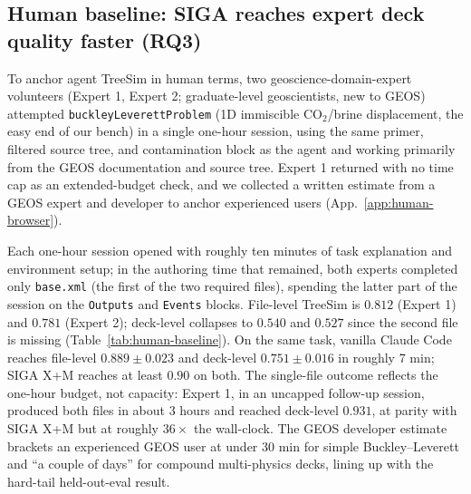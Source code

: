 \documentclass{article}
\begin{document}
\subsection{Human baseline: SIGA reaches expert deck quality faster (RQ3)}
\label{subsec:human-baseline}

To anchor agent TreeSim in human terms, two geoscience-domain-expert volunteers (Expert 1, Expert 2; graduate-level geoscientists, new to GEOS) attempted \texttt{buckleyLeverettProblem} (1D immiscible CO$_2$/brine displacement, the easy end of our bench) in a single one-hour session, using the same primer, filtered source tree, and contamination block as the agent and working primarily from the GEOS documentation and source tree. Expert 1 returned with no time cap as an extended-budget check, and we collected a written estimate from a GEOS expert and developer to anchor experienced users (App.~\ref{app:human-browser}).

Each one-hour session opened with roughly ten minutes of task explanation and environment setup; in the authoring time that remained, both experts completed only \texttt{base.xml} (the first of the two required files), spending the latter part of the session on the \texttt{Outputs} and \texttt{Events} blocks. File-level TreeSim is $0.812$ (Expert 1) and $0.781$ (Expert 2); deck-level collapses to $0.540$ and $0.527$ since the second file is missing (Table~\ref{tab:human-baseline}). On the same task, vanilla Claude Code reaches file-level $0.889 \pm 0.023$ and deck-level $0.751 \pm 0.016$ in roughly 7 min; SIGA X+M reaches at least $0.90$ on both. The single-file outcome reflects the one-hour budget, not capacity: Expert 1, in an uncapped follow-up session, produced both files in about 3 hours and reached deck-level $\mathbf{0.931}$, at parity with SIGA X+M but at roughly $36\times$ the wall-clock. The GEOS developer estimate brackets an experienced GEOS user at under 30 min for simple Buckley--Leverett and ``a couple of days'' for compound multi-physics decks, lining up with the hard-tail held-out-eval result.
\end{document}
